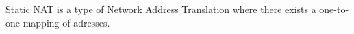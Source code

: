 Static NAT is a type of Network Address Translation where there exists a one-to-one mapping of adresses.